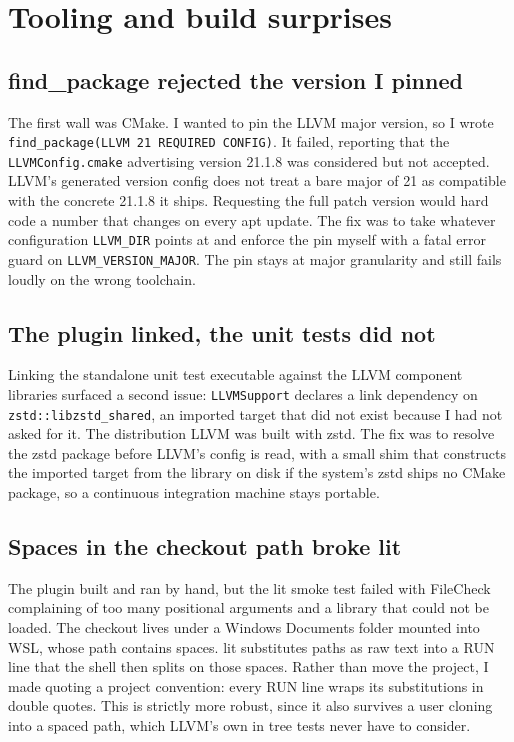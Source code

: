 \section{Tooling and build surprises}

\subsection{find\_package rejected the version I pinned}

The first wall was CMake. I wanted to pin the LLVM major version, so I wrote
\texttt{find\_package(LLVM 21 REQUIRED CONFIG)}. It failed, reporting that the
\texttt{LLVMConfig.cmake} advertising version 21.1.8 was considered but not
accepted. LLVM's generated version config does not treat a bare major of 21 as
compatible with the concrete 21.1.8 it ships. Requesting the full patch version
would hard code a number that changes on every apt update. The fix was to take
whatever configuration \texttt{LLVM\_DIR} points at and enforce the pin myself
with a fatal error guard on \texttt{LLVM\_VERSION\_MAJOR}. The pin stays at major
granularity and still fails loudly on the wrong toolchain.

\subsection{The plugin linked, the unit tests did not}

Linking the standalone unit test executable against the LLVM component libraries
surfaced a second issue: \texttt{LLVMSupport} declares a link dependency on
\texttt{zstd::libzstd\_shared}, an imported target that did not exist because I
had not asked for it. The distribution LLVM was built with zstd. The fix was to
resolve the zstd package before LLVM's config is read, with a small shim that
constructs the imported target from the library on disk if the system's zstd
ships no CMake package, so a continuous integration machine stays portable.

\subsection{Spaces in the checkout path broke lit}

The plugin built and ran by hand, but the lit smoke test failed with FileCheck
complaining of too many positional arguments and a library that could not be
loaded. The checkout lives under a Windows Documents folder mounted into WSL,
whose path contains spaces. lit substitutes paths as raw text into a RUN line
that the shell then splits on those spaces. Rather than move the project, I made
quoting a project convention: every RUN line wraps its substitutions in double
quotes. This is strictly more robust, since it also survives a user cloning into
a spaced path, which LLVM's own in tree tests never have to consider.

